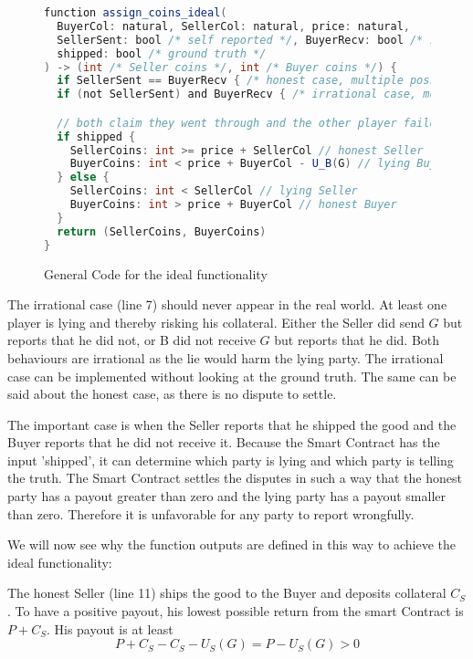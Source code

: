 \documentclass{cacthesis}
\begin{document}
\begin{figure}[htbp!]
    \centering
\begin{lstlisting}[language=java]
function assign_coins_ideal(
  BuyerCol: natural, SellerCol: natural, price: natural,
  SellerSent: bool /* self reported */, BuyerRecv: bool /* self reported */, 
  shipped: bool /* ground truth */
) -> (int /* Seller coins */, int /* Buyer coins */) {
  if SellerSent == BuyerRecv { /* honest case, multiple possible solutions  */ }
  if (not SellerSent) and BuyerRecv { /* irrational case, multiple possible solutions */ }

  // both claim they went through and the other player failed
  if shipped {
    SellerCoins: int >= price + SellerCol // honest Seller
    BuyerCoins: int < price + BuyerCol - U_B(G) // lying Buyer
  } else {
    SellerCoins: int < SellerCol // lying Seller
    BuyerCoins: int > price + BuyerCol // honest Buyer
  }
  return (SellerCoins, BuyerCoins)
}
\end{lstlisting}
\label{fig:code_ideal_sc}
    \caption{General Code for the ideal functionality}
\end{figure}
The irrational case (line 7) should never appear in the real world. At least one player is lying and thereby risking his collateral. Either the Seller did send $G$ but reports that he did not, or B did not receive $G$ but reports that he did. Both behaviours are irrational as the lie would harm the lying party. The irrational case can be implemented without looking at the ground truth. The same can be said about the honest case, as there is no dispute to settle.\newline

The important case is when the Seller reports that he shipped the good and the Buyer reports that he did not receive it. Because the Smart Contract has the input 'shipped', it can determine which party is lying and which party is telling the truth.
The Smart Contract settles the disputes in such a way that the honest party has a payout greater than zero and the lying party has a payout smaller than zero. Therefore it is unfavorable for any party to report wrongfully.\newline

We will now see why the function outputs are defined in this way to achieve the ideal functionality:\newline

The honest Seller (line 11) ships the good to the Buyer and deposits collateral $C_S$. To have a positive payout, his lowest possible return from the smart Contract is $P + C_S$. His payout is at least
\[P + C_S - C_S - U_S(G) = P - U_S(G) > 0\]
\end{document}
